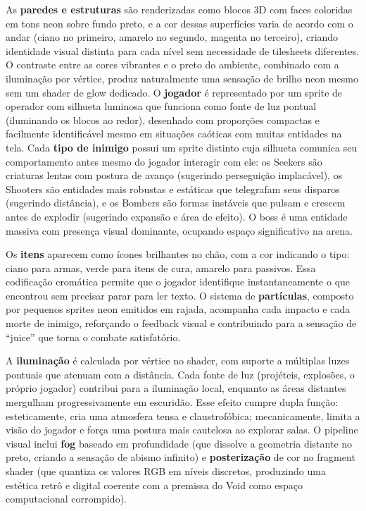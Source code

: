 \documentclass[12pt, a4paper]{article}
\begin{document}
As \textbf{paredes e estruturas} s\~ao renderizadas como blocos 3D com faces coloridas em tons neon sobre fundo preto, e a cor dessas superf\'icies varia de acordo com o andar (ciano no primeiro, amarelo no segundo, magenta no terceiro), criando identidade visual distinta para cada n\'ivel sem necessidade de tilesheets diferentes. O contraste entre as cores vibrantes e o preto do ambiente, combinado com a ilumina\c{c}\~ao por v\'ertice, produz naturalmente uma sensa\c{c}\~ao de brilho neon mesmo sem um shader de glow dedicado. O \textbf{jogador} \'e representado por um sprite de operador com silhueta luminosa que funciona como fonte de luz pontual (iluminando os blocos ao redor), desenhado com propor\c{c}\~oes compactas e facilmente identific\'avel mesmo em situa\c{c}\~oes ca\'oticas com muitas entidades na tela. Cada \textbf{tipo de inimigo} possui um sprite distinto cuja silhueta comunica seu comportamento antes mesmo do jogador interagir com ele: os Seekers s\~ao criaturas lentas com postura de avan\c{c}o (sugerindo persegui\c{c}\~ao implac\'avel), os Shooters s\~ao entidades mais robustas e est\'aticas que telegrafam seus disparos (sugerindo dist\^ancia), e os Bombers s\~ao formas inst\'aveis que pulsam e crescem antes de explodir (sugerindo expans\~ao e \'area de efeito). O boss \'e uma entidade massiva com presen\c{c}a visual dominante, ocupando espa\c{c}o significativo na arena.

Os \textbf{itens} aparecem como \'icones brilhantes no ch\~ao, com a cor indicando o tipo: ciano para armas, verde para itens de cura, amarelo para passivos. Essa codifica\c{c}\~ao crom\'atica permite que o jogador identifique instantaneamente o que encontrou sem precisar parar para ler texto. O sistema de \textbf{part\'iculas}, composto por pequenos sprites neon emitidos em rajada, acompanha cada impacto e cada morte de inimigo, refor\c{c}ando o feedback visual e contribuindo para a sensa\c{c}\~ao de ``juice'' que torna o combate satisfat\'orio.

A \textbf{ilumina\c{c}\~ao} \'e calculada por v\'ertice no shader, com suporte a m\'ultiplas luzes pontuais que atenuam com a dist\^ancia. Cada fonte de luz (proj\'eteis, explos\~oes, o pr\'oprio jogador) contribui para a ilumina\c{c}\~ao local, enquanto as \'areas distantes mergulham progressivamente em escurid\~ao. Esse efeito cumpre dupla fun\c{c}\~ao: esteticamente, cria uma atmosfera tensa e claustrofóbica; mecanicamente, limita a vis\~ao do jogador e for\c{c}a uma postura mais cautelosa ao explorar salas. O pipeline visual inclui \textbf{fog} baseado em profundidade (que dissolve a geometria distante no preto, criando a sensa\c{c}\~ao de abismo infinito) e \textbf{posteriza\c{c}\~ao} de cor no fragment shader (que quantiza os valores RGB em n\'iveis discretos, produzindo uma est\'etica retr\^o e digital coerente com a premissa do Void como espa\c{c}o computacional corrompido).
\end{document}
